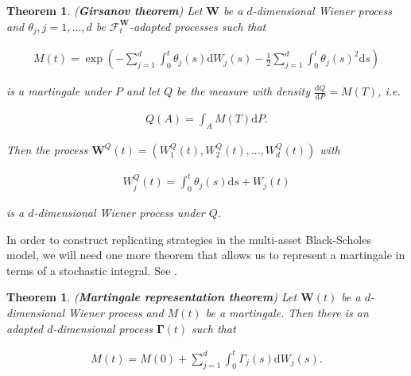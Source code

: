 \documentclass[a4paper]{article}
\newtheorem{theorem}[definition]{Theorem}
\begin{document}
\begin{theorem}\label{thm:girsanov}
  (\textbf{Girsanov theorem}) Let $\mathbf{W}$ be a $d$-dimensional Wiener process and $\theta_j, j=1,\ldots,d$ be $\mathcal{F}^\mathbf{W}_t$-adapted processes such that

  \begin{align*}
    M(t) = \exp \left( - \sum_{j=1}^d \int_0^t \theta_j(s) \mathrm{d}W_j(s) - \frac{1}{2} \sum_{j=1}^d \int_0^t \theta_j(s)^2 \mathrm{d}s \right)
  \end{align*}

  is a martingale under $P$ and let $Q$ be the measure with density $\frac{\mathrm{d}Q}{\mathrm{d}P} = M(T)$, i.e.

  \begin{align*}
    Q(A) = \int_A M(T) \mathrm{d}P.
  \end{align*}

  Then the process $\mathbf{W}^Q(t) = (W^Q_1(t), W^Q_2(t), \ldots, W^Q_d(t))$ with

  \begin{align*}
    W^Q_j(t) = \int_0^t \theta_j(s) \mathrm{d}s + W_j(t)
  \end{align*}

  is a $d$-dimensional Wiener process under $Q$.
\end{theorem}

In order to construct replicating strategies in the multi-asset Black-Scholes model, we will need one more theorem that allows us to represent a martingale in terms of a stochastic integral. See \textcite{shreve_stochastic_2004}.

\begin{theorem}
  (\textbf{Martingale representation theorem}) Let $\mathbf{W}(t)$ be a $d$-dimensional Wiener process and $M(t)$ be a martingale. Then there is an adapted $d$-dimensional process $\mathbf{\Gamma}(t)$ such that

  \begin{align*}
    M(t) = M(0) + \sum_{j=1}^{d} \int_0^t \Gamma_j(s) \mathrm{d}W_j(s).
  \end{align*}
\end{theorem}
\end{document}
